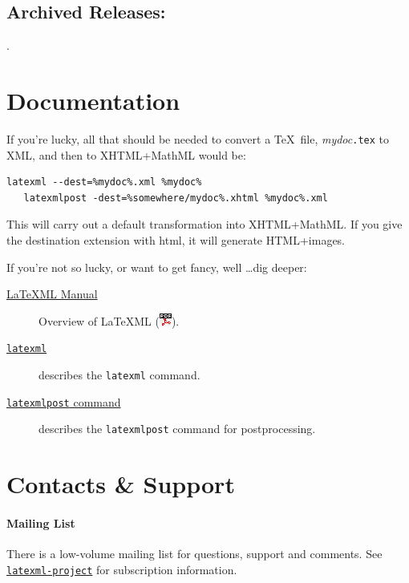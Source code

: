 \documentclass{article}
\newcommand{\PDFIcon}{\includegraphics{pdf}}
\begin{document}
\subsection{Archived Releases:}\label{archive}
\AllReleases.

\section{Documentation}\label{docs}
If you're lucky, all that should be needed to convert
a \TeX\ file, \textit{mydoc}\texttt{.tex} to XML, and
then to XHTML+MathML would be:
\begin{lstlisting}[style=shell]
   latexml --dest=%mydoc%.xml %mydoc%
   latexmlpost -dest=%somewhere/mydoc%.xhtml %mydoc%.xml
\end{lstlisting}
This will carry out a default transformation into XHTML+MathML.  If you
give the destination extension with html, it will generate HTML+images.

If you're not so lucky, or want to get fancy, well \ldots dig deeper:
\begin{description}
\item[\href{manual/index.xhtml}{LaTeXML Manual}]
    Overview of LaTeXML (\href{manual.pdf}{\PDFIcon}).
\item[\href{manual/commands/latexml.xhtml}{\texttt{latexml}}]
    describes the \texttt{latexml} command.
\item[\href{manual/commands/latexmlpost.xhtml}{\texttt{latexmlpost} command}]
   describes the \texttt{latexmlpost} command for postprocessing.
\end{description}


\section{Contacts \& Support}\label{contact}

\paragraph{Mailing List}
There is a low-volume mailing list for questions, support and comments.
See \href{http://lists.jacobs-university.de/mailman/listinfo/project-latexml}{\texttt{latexml-project}} for subscription information.
\end{document}
